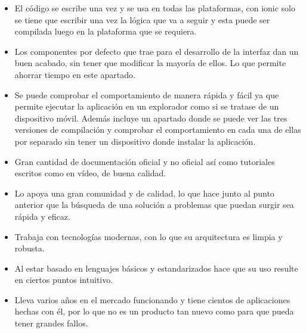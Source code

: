 \begin{itemize}
    \item El código se escribe una vez y se usa en todas
    las plataformas, con ionic solo se tiene que escribir
    una vez la lógica que va a seguir y esta puede ser
    compilada luego en la plataforma que se requiera.
    \item Los componentes por defecto que trae para el
    desarrollo de la interfaz dan un buen acabado, sin
    tener que modificar la mayoría de ellos. Lo que permite
    ahorrar tiempo en este apartado.
    \item Se puede comprobar el comportamiento de manera rápida
    y fácil ya que permite ejecutar la aplicación en un
    explorador como si se tratase de un dispositivo móvil.
    Además incluye un apartado donde se puede ver las tres
    versiones de compilación y comprobar el comportamiento
    en cada una de ellas por separado sin tener un dispositivo
    donde instalar la aplicación.
    \item Gran cantidad de documentación oficial y no oficial
    así como tutoriales escritos como en vídeo, de buena calidad.
    \item Lo apoya una gran comunidad y de calidad, lo que hace
    junto al punto anterior que la búsqueda de una solución a
    problemas que puedan surgir sea rápida y eficaz.
    \item Trabaja con tecnologías modernas, con lo que
    su arquitectura es limpia y robusta.
    \item Al estar basado en lenguajes básicos y estandarizados
    hace que su uso resulte en ciertos puntos intuitivo.
    \item Lleva varios años en el mercado funcionando y tiene
    cientos de aplicaciones hechas con él, por lo que no es un
    producto tan nuevo como para que pueda tener grandes fallos.
\end{itemize}

